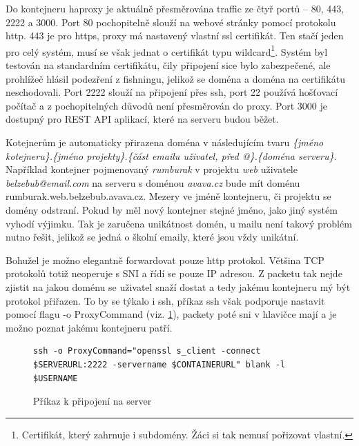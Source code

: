 \documentclass[a4paper,oneside,12pt]{report}
\begin{document}
Do kontejneru haproxy je aktuálně přesměrována traffic ze čtyř portů -- 80, 443, 2222 a 3000.
Port 80 pochopitelně slouží na webové stránky pomocí protokolu http.
443 je pro https, proxy má nastavený vlastní ssl certifikát.
Ten stačí jeden pro celý systém, musí se však jednat o certifikát typu wildcard\footnote{Certifikát, který zahrnuje i subdomény. Žáci si tak nemusí pořizovat vlastní.}.
Systém byl testován na standardním certifikátu, čily připojení sice bylo zabezpečené, ale prohlížeč hlásil podezření z fishningu, jelikož se doména a doména na certifikátu neschodovali.
Port 2222 slouží na připojení přes ssh, port 22 používá hošťovací počítač a z pochopitelných důvodů není přesměrován do proxy.
Port 3000 je dostupný pro REST API aplikací, které na serveru budou běžet.

Kotejnerům je automaticky přirazena doména v následujícím tvaru \textit{\{jméno kotejneru\}.\{jméno projekty\}.\{část emailu uživatel, před @\}.\{doména serveru\}}.
Například kontejner pojmenovaný \textit{rumburak} v projektu \textit{web} uživatele \textit{belzebub@email.com} na serveru s doménou \textit{avava.cz} bude mít doménu {rumburak.web.belzebub.avava.cz}.
Mezery ve jméně kontejneru, či projektu se domény odstraní.
Pokud by měl nový kontejner stejné jméno, jako jiný systém vyhodí výjimku.
Tak je zaručena unikátnost domén, u mailu není takový problém nutno řešit, jelikož se jedná o školní emaily, které jsou vždy unikátní.

Bohužel je možno elegantně forwardovat pouze http protokol.
Většina TCP protokolů totiž neoperuje s SNI a řídí se pouze IP adresou.
Z packetu tak nejde zjistit na jakou doménu se uživatel snaží dostat a tedy jakému kontejneru mý být protokol přiřazen.
To by se týkalo i ssh, příkaz ssh však podporuje nastavit pomocí flagu -o ProxyCommand (viz. \ref{fig:sshcom}), packety poté sni v hlavičce mají a je možno poznat jakému kontejneru patří.
\begin{figure}[h]
\begin{lstlisting}[breaklines]
ssh -o ProxyCommand="openssl s_client -connect $SERVERURL:2222 -servername $CONTAINERURL" blank -l $USERNAME
\end{lstlisting}
\caption[Příkaz k připojení na server, vlastní tvorba]{Příkaz k připojení na server\protect\footnotemark}
\label{fig:sshcom}
\end{figure}
\end{document}
